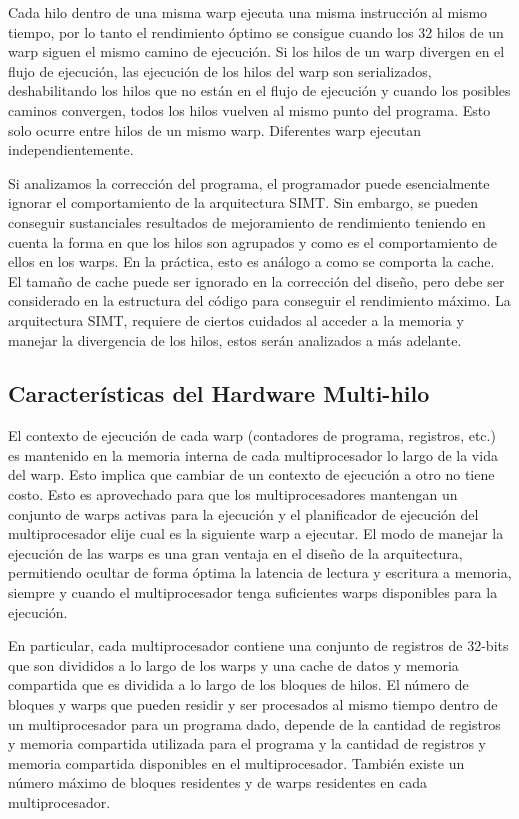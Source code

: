 \documentclass[a4paper,openright,12pt, oneside]{book}
\begin{document}
Cada hilo dentro de una misma warp ejecuta una misma instrucci\'on al mismo tiempo, por lo tanto el rendimiento
\'optimo se consigue cuando los 32 hilos de un warp siguen el mismo camino de ejecuci\'on.
Si los hilos de un warp divergen en el flujo de ejecuci\'on, las ejecuci\'on de los 
hilos del warp son serializados, deshabilitando los hilos que no est\'an en el flujo
de ejecuci\'on y cuando los posibles caminos convergen, todos los hilos vuelven
al mismo punto del programa. Esto solo ocurre entre hilos de un mismo warp. Diferentes
warp ejecutan independientemente.

Si analizamos la correcci\'on del programa, el programador puede esencialmente
ignorar el comportamiento de la arquitectura SIMT. Sin embargo, se pueden conseguir
sustanciales resultados de mejoramiento de rendimiento teniendo en cuenta la forma
en que los hilos son agrupados y como es el comportamiento de ellos en los warps.
En la pr\'actica, esto es an\'alogo a como se comporta la cache. El tama\~no de cache
puede ser ignorado en la correcci\'on del dise\~no, pero debe ser considerado en la
estructura del c\'odigo para conseguir el rendimiento m\'aximo. La arquitectura SIMT,
requiere de ciertos cuidados al acceder a la memoria y manejar la divergencia
de los hilos, estos ser\'an analizados a m\'as adelante.

\subsection{Caracter\'isticas del Hardware Multi-hilo}

El contexto de ejecuci\'on de cada warp (contadores de programa, registros, etc.) es mantenido
en la memoria interna de cada multiprocesador lo largo de la vida del warp. Esto implica que cambiar
de un contexto de ejecuci\'on a otro no tiene costo. Esto es aprovechado para
que los multiprocesadores mantengan un conjunto de warps activas para la ejecuci\'on
y el planificador de ejecuci\'on del multiprocesador elije cual es la
siguiente warp a ejecutar. El modo de manejar la ejecuci\'on de las warps es una 
gran ventaja en el dise\~no de la arquitectura, permitiendo ocultar de forma 
\'optima la latencia de lectura y escritura a memoria, siempre y cuando el 
multiprocesador tenga suficientes warps disponibles para la ejecuci\'on.

En particular, cada multiprocesador contiene una conjunto de registros de 32-bits
que son divididos a lo largo de los warps y una cache de datos y memoria compartida
que es dividida a lo largo de los bloques de hilos. El n\'umero de bloques y warps 
que pueden residir y ser procesados al mismo tiempo dentro de un multiprocesador 
para un programa dado, depende de la cantidad de
registros y memoria compartida utilizada para el programa y la cantidad
de registros y memoria compartida disponibles en el multiprocesador. Tambi\'en
existe un n\'umero m\'aximo de bloques residentes y de warps residentes en cada
multiprocesador.
\end{document}
